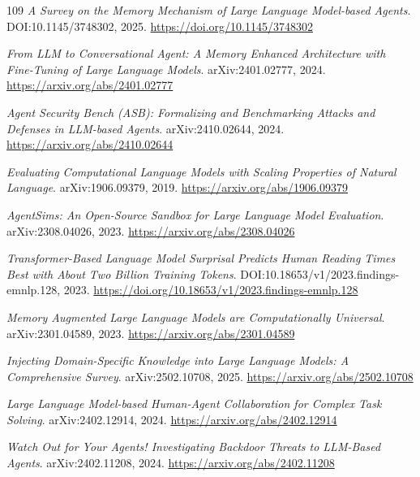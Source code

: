 \documentclass[11pt,a4paper]{article}
\begin{document}
\begin{thebibliography}{109}
\newblock \emph{A Survey on the Memory Mechanism of Large Language Model-based Agents}.
\newblock DOI:10.1145/3748302, 2025.
\newblock \url{https://doi.org/10.1145/3748302}

\newblock \emph{From LLM to Conversational Agent: A Memory Enhanced Architecture with Fine-Tuning of Large Language Models}.
\newblock arXiv:2401.02777, 2024.
\newblock \url{https://arxiv.org/abs/2401.02777}

\newblock \emph{Agent Security Bench (ASB): Formalizing and Benchmarking Attacks and Defenses in LLM-based Agents}.
\newblock arXiv:2410.02644, 2024.
\newblock \url{https://arxiv.org/abs/2410.02644}

\newblock \emph{Evaluating Computational Language Models with Scaling Properties of Natural Language}.
\newblock arXiv:1906.09379, 2019.
\newblock \url{https://arxiv.org/abs/1906.09379}

\newblock \emph{AgentSims: An Open-Source Sandbox for Large Language Model Evaluation}.
\newblock arXiv:2308.04026, 2023.
\newblock \url{https://arxiv.org/abs/2308.04026}

\newblock \emph{Transformer-Based Language Model Surprisal Predicts Human Reading Times Best with About Two Billion Training Tokens}.
\newblock DOI:10.18653/v1/2023.findings-emnlp.128, 2023.
\newblock \url{https://doi.org/10.18653/v1/2023.findings-emnlp.128}

\newblock \emph{Memory Augmented Large Language Models are Computationally Universal}.
\newblock arXiv:2301.04589, 2023.
\newblock \url{https://arxiv.org/abs/2301.04589}

\newblock \emph{Injecting Domain-Specific Knowledge into Large Language Models: A Comprehensive Survey}.
\newblock arXiv:2502.10708, 2025.
\newblock \url{https://arxiv.org/abs/2502.10708}

\newblock \emph{Large Language Model-based Human-Agent Collaboration for Complex Task Solving}.
\newblock arXiv:2402.12914, 2024.
\newblock \url{https://arxiv.org/abs/2402.12914}

\newblock \emph{Watch Out for Your Agents! Investigating Backdoor Threats to LLM-Based Agents}.
\newblock arXiv:2402.11208, 2024.
\newblock \url{https://arxiv.org/abs/2402.11208}


\end{thebibliography}
\end{document}
